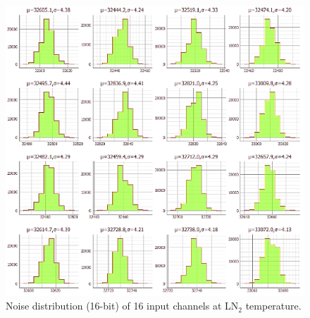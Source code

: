 \begin{figure}[h!]
\centering
  \includegraphics[width=0.8\linewidth]{figures/qc_noisecold.png}
  \caption{Noise distribution (16-bit) of 16 input channels at LN$_2$ temperature.}
  \label{fig:qc_noisecold}
\end{figure}

